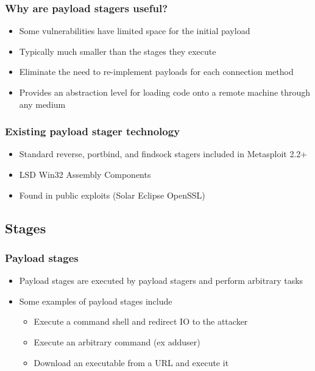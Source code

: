\documentclass{beamer}
\newenvironment{sitemize}{\vspace{1mm}\begin{itemize}\itemsep 4pt\small}{\end{itemize}}
\begin{document}
\begin{frame}[t]
    \frametitle{Why are payload stagers useful?}

    \begin{sitemize}
        \item Some vulnerabilities have limited space for the
        initial payload

        \item Typically much smaller than the stages
        they execute

        \pause
        \item Eliminate the need to re-implement payloads for each
        connection method

        \pause
    \item Provides an abstraction level for loading code onto a remote
    machine through any medium
    \end{sitemize}
\end{frame}

\begin{frame}[t]
    \frametitle{Existing payload stager technology}

    \begin{sitemize}
        \item Standard reverse, portbind, and findsock stagers
        included in Metasploit 2.2+

    \item LSD Win32 Assembly Components

    \item Found in public exploits (Solar Eclipse OpenSSL)

    \end{sitemize}
\end{frame}

\subsection{Stages}
\begin{frame}[t]
    \frametitle{Payload stages}

    \begin{sitemize}
        \item Payload stages are executed by payload stagers and
        perform arbitrary tasks

        \pause
        \item Some examples of payload stages include
        \begin{sitemize}
            \item Execute a command shell and redirect IO to the
            attacker
            \item Execute an arbitrary command (ex adduser)
            \item Download an executable from a URL and execute it
        \end{sitemize}
    \end{sitemize}
\end{frame}
\end{document}
